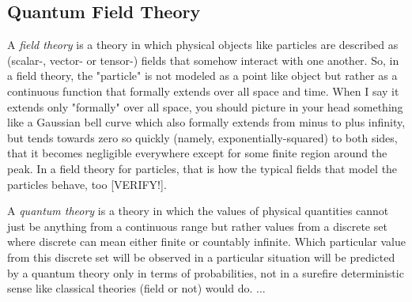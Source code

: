 % 









\subsection{Quantum Field Theory}

A \emph{field theory} is a theory in which physical objects like particles are described as (scalar-, vector- or tensor-) fields that somehow interact with one another. So, in a field theory, the "particle" is not modeled as a point like object but rather as a continuous function that formally extends over all space and time. When I say it extends only "formally" over all space, you should picture in your head something like a Gaussian bell curve which also formally extends from minus to plus infinity, but tends towards zero so quickly (namely, exponentially-squared) to both sides, that it becomes negligible everywhere except for some finite region around the peak. In a field theory for particles, that is how the typical fields that model the particles behave, too [VERIFY!].

\medskip
A \emph{quantum theory} is a theory in which the values of physical quantities cannot just be anything from a continuous range but rather values from a discrete set where discrete can mean either finite or countably infinite. Which particular value from this discrete set will be observed in a particular situation will be predicted by a quantum theory only in terms of probabilities, not in a surefire deterministic sense like classical theories (field or not) would do. ...

